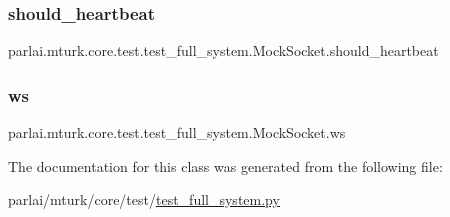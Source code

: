 \subsubsection{\texorpdfstring{should\+\_\+heartbeat}{should\_heartbeat}}
{\footnotesize\ttfamily parlai.\+mturk.\+core.\+test.\+test\+\_\+full\+\_\+system.\+Mock\+Socket.\+should\+\_\+heartbeat}

\mbox{\label{classparlai_1_1mturk_1_1core_1_1test_1_1test__full__system_1_1MockSocket_a954ed7f85a85a36db6ce598d5e633aea}} 
\subsubsection{\texorpdfstring{ws}{ws}}
{\footnotesize\ttfamily parlai.\+mturk.\+core.\+test.\+test\+\_\+full\+\_\+system.\+Mock\+Socket.\+ws}



The documentation for this class was generated from the following file\+:\begin{DoxyCompactItemize}
\item 
parlai/mturk/core/test/\hyperlink{test_2test__full__system_8py}{test\+\_\+full\+\_\+system.\+py}\end{DoxyCompactItemize}
